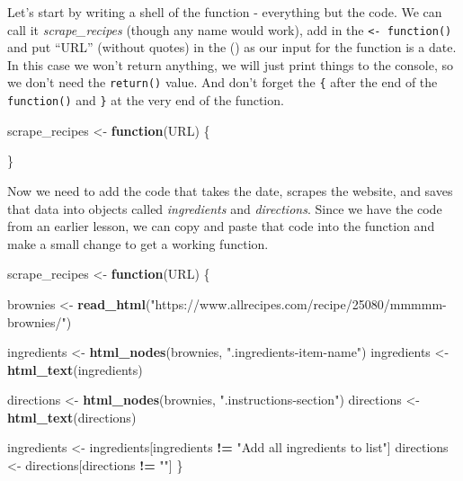\documentclass[
  12pt,
]{book}
\newenvironment{Shaded}{\begin{snugshade}}{\end{snugshade}}
\newcommand{\ControlFlowTok}[1]{\textcolor[rgb]{0.27,0.27,0.27}{\textbf{#1}}}
\newcommand{\KeywordTok}[1]{\textcolor[rgb]{0.27,0.27,0.27}{\textbf{#1}}}
\newcommand{\NormalTok}[1]{#1}
\newcommand{\OperatorTok}[1]{\textcolor[rgb]{0.43,0.43,0.43}{\textbf{#1}}}
\newcommand{\StringTok}[1]{\textcolor[rgb]{0.5,0.5,0.5}{#1}}
\begin{document}
Let's start by writing a shell of the function - everything but the code. We can call it \emph{scrape\_recipes} (though any name would work), add in the \texttt{\textless{}-\ function()} and put ``URL'' (without quotes) in the () as our input for the function is a date. In this case we won't return anything, we will just print things to the console, so we don't need the \texttt{return()} value. And don't forget the \texttt{\{} after the end of the \texttt{function()} and \texttt{\}} at the very end of the function.

\begin{Shaded}
\begin{Highlighting}[]
\NormalTok{scrape\_recipes \textless{}{-}}\StringTok{ }\ControlFlowTok{function}\NormalTok{(URL) \{}
  
\NormalTok{\}}
\end{Highlighting}
\end{Shaded}

Now we need to add the code that takes the date, scrapes the website, and saves that data into objects called \emph{ingredients} and \emph{directions}. Since we have the code from an earlier lesson, we can copy and paste that code into the function and make a small change to get a working function.

\begin{Shaded}
\begin{Highlighting}[]
\NormalTok{scrape\_recipes \textless{}{-}}\StringTok{ }\ControlFlowTok{function}\NormalTok{(URL) \{}
  
\NormalTok{  brownies \textless{}{-}}\StringTok{ }\KeywordTok{read\_html}\NormalTok{(}\StringTok{"https://www.allrecipes.com/recipe/25080/mmmmm{-}brownies/"}\NormalTok{)}
  
\NormalTok{  ingredients \textless{}{-}}\StringTok{ }\KeywordTok{html\_nodes}\NormalTok{(brownies, }\StringTok{".ingredients{-}item{-}name"}\NormalTok{)}
\NormalTok{  ingredients \textless{}{-}}\StringTok{ }\KeywordTok{html\_text}\NormalTok{(ingredients)}
  
\NormalTok{  directions \textless{}{-}}\StringTok{ }\KeywordTok{html\_nodes}\NormalTok{(brownies, }\StringTok{".instructions{-}section"}\NormalTok{)}
\NormalTok{  directions \textless{}{-}}\StringTok{ }\KeywordTok{html\_text}\NormalTok{(directions)}
  
\NormalTok{  ingredients \textless{}{-}}\StringTok{ }\NormalTok{ingredients[ingredients }\OperatorTok{!=}\StringTok{ "Add all ingredients to list"}\NormalTok{]}
\NormalTok{  directions \textless{}{-}}\StringTok{ }\NormalTok{directions[directions }\OperatorTok{!=}\StringTok{ ""}\NormalTok{]}
\NormalTok{\}}
\end{Highlighting}
\end{Shaded}
\end{document}
